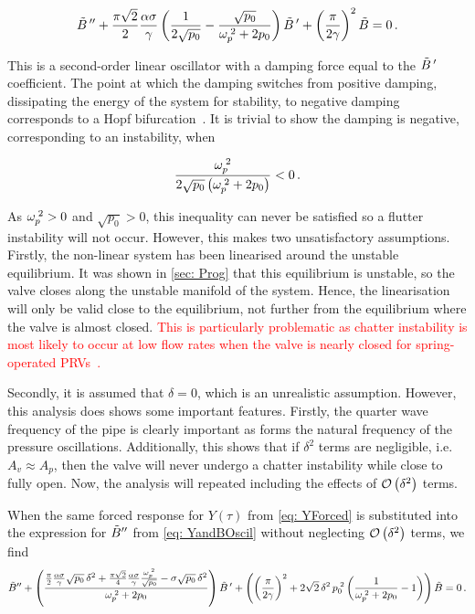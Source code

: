 \begin{equation*}
    \tilde{B}\,{''} + \frac{\pi \sqrt{2}}{2} \frac{\alpha \sigma}{\gamma} \left( \frac{1}{2 \sqrt{p_0}} - \frac{\sqrt{p_0}}{\omega_p^{\;2}+2 p_0} \right) \tilde{B}\,{'} + \left( \frac{\pi}{2 \gamma} \right)^2 \tilde{B} = 0 \, .
\end{equation*}

This is a second-order linear oscillator with a damping force equal to the $\tilde{B}\,{'}$ coefficient. The point at which the damping switches from positive damping, dissipating the energy of the system for stability, to negative damping corresponds to a Hopf bifurcation~\cite{Kuznetsov2004ElementsTheory}. It is trivial to show the damping is negative, corresponding to an instability, when

\begin{equation*}
    \frac{\omega_p^{\;2}}{2 \sqrt{p_0} \left( \omega_p^{\;2} + 2 p_0 \right)} < 0 \, .
\end{equation*}

As $\omega_p^{\;2} > 0$ and $\sqrt{p_0} > 0$, this inequality can never be satisfied so a flutter instability will not occur. However, this makes two unsatisfactory assumptions. Firstly, the non-linear system has been linearised around the unstable equilibrium. It was shown in \cref{sec: Prog} that this equilibrium is unstable, so the valve closes along the unstable manifold of the system. Hence, the linearisation will only be valid close to the equilibrium, not further from the equilibrium where the valve is almost closed. \textcolor{Red}{This is particularly problematic as chatter instability is most likely to occur at low flow rates when the valve is nearly closed for spring-operated PRVs~\cite{Hos2016DynamicService}.}

Secondly, it is assumed that $\delta = 0$, which is an unrealistic assumption. However, this analysis does shows some important features. Firstly, the quarter wave frequency of the pipe is clearly important as forms the natural frequency of the pressure oscillations. Additionally, this shows that if $\delta^2$ terms are negligible, i.e. $A_v \approx A_p$, then the valve will never undergo a chatter instability while close to fully open. Now, the analysis will repeated including the effects of $\mathcal{O}\left( \delta^2 \right)$ terms.

When the same forced response for $Y(\tau)$ from \cref{eq: YForced} is substituted into the expression for $\tilde{B}{''}$ from \cref{eq: YandBOscil} without neglecting $\mathcal{O}\left( \delta^2 \right)$ terms, we find
~
\begin{equation*}
    \tilde{B}{''} +
    \left( \frac{
    \frac{\pi}{2} \frac{\alpha \sigma}{\gamma} \sqrt{p_0} \, \delta^2 + \frac{\pi \sqrt{2}}{4} \frac{\alpha \sigma}{\gamma} \frac{\omega_p^{\;2}}{\sqrt{p_0}} - \sigma \sqrt{p_0} \, \delta^2
    }{\omega_p^{\;2} + 2 p_0} \right) \tilde{B}\,{'} +
    \left( \left( \frac{\pi}{2 \gamma} \right)^2 + 2 \sqrt{2} \, \delta^2 \, p_0^{\;2} \left( \frac{1}{\omega_p^{\;2} + 2 p_0} - 1 \right) \right) \tilde{B} = 0 \, .
\end{equation*}


